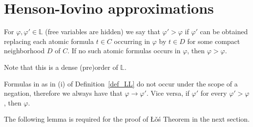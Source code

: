 \documentclass[12pt,letterpaper,oneside,reqno]{amsart}
\theoremstyle{plain}
\newtheorem{lemma}[theorem]{Lemma}
\theoremstyle{remark}
\begin{document}





\def\ceq#1#2#3{\parbox[t]{33ex}{$\displaystyle #1$}\parbox{5ex}{\hfil $#2$}{$\displaystyle #3$}}
\section{Henson-Iovino approximations}\label{ultrapws}


For $\varphi,\varphi'\in\mathds{L}$ (free variables are hidden) we say that $\varphi'>\varphi$ if $\varphi'$ can be obtained replacing each atomic formula $t\in C$ occurring in $\varphi$ by $t\in D$ for some compact neighborhood $D$ of $C$.
If no such atomic formulas occurs in $\varphi$, then $\varphi>\varphi$.

Note that this is a dense (pre)order of $\mathds{L}$.

Formulas in as in (i) of Definition~\ref{def_LL} do not occur under the scope of a negation, therefore we always have that $\varphi\to\varphi'$.
Vice versa, if $\varphi'$ for every $\varphi'>\varphi$, then $\varphi$.

The following lemma is required for the proof of \L\v o\'s Theorem in the next section.
\end{document}
